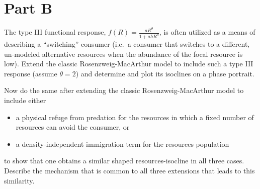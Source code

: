 \documentclass[11pt,letterpaper]{article}
\begin{document}
	\section{Part B}
	The type III functional response, $f(R) = \frac{a R^\theta}{1 + a h R^\theta}$, is often utilized as a means of describing a ``switching'' consumer (i.e.~a consumer that switches to a different, un-modeled alternative resources when the abundance of the focal resource is low).  	
	Extend the classic Rosenzweig-MacArthur model to include such a type III response (assume $\theta = 2$) and determine and plot its isoclines on a phase portrait.
	
	Now do the same after extending the classic Rosenzweig-MacArthur model to include either 
	\begin{itemize} 
		\item a physical refuge from predation for the resources in which a fixed number of resources can avoid the consumer, or 
		\item a density-independent immigration term for the resources population
	\end{itemize}
	to show that one obtains a similar shaped resources-isocline in all three cases.  Describe the mechanism that is common to all three extensions that leads to this similarity.
		
\end{document}
